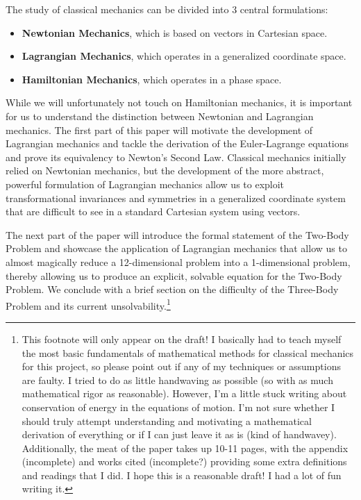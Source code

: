 \documentclass[10pt, psamsfonts]{amsart}
\theoremstyle{definition}
\theoremstyle{remark}
\numberwithin{equation}{section}
\begin{document}
The study of classical mechanics can be divided into 3 central formulations:
\begin{itemize}
  \item[] \textbf{Newtonian Mechanics}, which is based on vectors in Cartesian space.
  \item[] \textbf{Lagrangian Mechanics}, which operates in a generalized coordinate space.
  \item[] \textbf{Hamiltonian Mechanics}, which operates in a phase space.
\end{itemize}
While we will unfortunately not touch on Hamiltonian mechanics, it is important for us to understand the distinction between Newtonian and Lagrangian mechanics. The first part of this paper will motivate the development of Lagrangian mechanics and tackle the derivation of the Euler-Lagrange equations and prove its equivalency to Newton's Second Law. Classical mechanics initially relied on Newtonian mechanics, but the development of the more abstract, powerful formulation of Lagrangian mechanics allow us to exploit transformational invariances and symmetries in a generalized coordinate system that are difficult to see in a standard Cartesian system using vectors.

The next part of the paper will introduce the formal statement of the Two-Body Problem and showcase the application of Lagrangian mechanics that allow us to almost magically reduce a 12-dimensional problem into a 1-dimensional problem, thereby allowing us to produce an explicit, solvable equation for the Two-Body Problem. We conclude with a brief section on the difficulty of the Three-Body Problem and its current unsolvability.\footnote[0]{This footnote will only appear on the draft! I basically had to teach myself the most basic fundamentals of mathematical methods for classical mechanics for this project, so please point out if any of my techniques or assumptions are faulty. I tried to do as little handwaving as possible (so with as much mathematical rigor as reasonable). However, I'm a little stuck writing about conservation of energy in the equations of motion. I'm not sure whether I should truly attempt understanding and motivating a mathematical derivation of everything or if I can just leave it as is (kind of handwavey). Additionally, the meat of the paper takes up 10-11 pages, with the appendix (incomplete) and works cited (incomplete?) providing some extra definitions and readings that I did. I hope this is a reasonable draft! I had a lot of fun writing it.}
\end{document}
